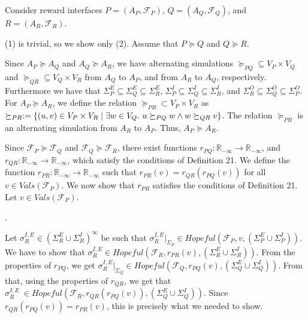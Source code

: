  
 
Consider reward interfaces $P=(A_{P},\mathcal{F}_{P})$, $Q=(A_{Q},\mathcal{F}_{Q})$, and $R=(A_{R},\mathcal{F}_{R})$.\par
 
 
 
(1) is trivial, so we show only (2). Assume that $P\succeq Q$ and $Q\succeq R$.\par
 
 
 
Since $A_{P}\succeq A_{Q}$ and $A_{Q}\succeq A_{R}$, we have alternating simulations $\succeq_{PQ}\subseteq V_{P}\times V_{Q}$ and $\succeq_{QR}\subseteq V_{Q}\times V_{R}$ from $A_{Q}$ to $A_{P}$, and from $A_{R}$ to $A_{Q}$, respectively. Furthermore we have that $\Sigma_{P}^{E}\subseteq\Sigma_{Q}^{E}\subseteq\Sigma_{R}^{E}$, $\Sigma_{P}^{I}\subseteq\Sigma_{Q}^{I}\subseteq\Sigma_{R}^{I}$, and $\Sigma_{R}^{O}\subseteq\Sigma_{Q}^{O}\subseteq\Sigma_{P}^{O}$. For $A_{P}\succeq A_{R}$, we define the relation $\succeq_{PR}\subset V_{P}\times V_{R}$ as $\succeq_{PR}:=\{(u,v)\in V_{P}\times V_{R}\mid\exists w\in V_{Q}.\nobreak\ u\succeq_{PQ}w\land w\succeq_{QR}v\}$. The relation $\succeq_{PR}$ is an alternating simulation from $A_{R}$ to $A_{P}$. Thus, $A_{P}\succeq A_{R}$.\par
 
 
 
Since $\mathcal{F}_{P}\succeq\mathcal{F}_{Q}$ and $\mathcal{F}_{Q}\succeq\mathcal{F}_{R}$, there exist functions $r_{PQ}:\mathbb{R}_{-\infty}\to\mathbb{R}_{-\infty}$, and $r_{QR}:\mathbb{R}_{-\infty}\to\mathbb{R}_{-\infty}$, which satisfy the conditions of Definition 21. We define the function $r_{PR}:\mathbb{R}_{-\infty}\to\mathbb{R}_{-\infty}$ such that $r_{PR}(v)=r_{QR}(r_{PQ}(v))$ for all $v\in\mathit{Vals}(\mathcal{F}_{P})$. We now show that $r_{PR}$ satisfies the conditions of Definition 21. Let $v\in\mathit{Vals}(\mathcal{F}_{P})$.\par
  
\par{}. 
 
Let $\sigma_{R}^{I,E}\in(\Sigma_{R}^{E}\cup\Sigma_{R}^{I})^{\infty}$ be such that $\sigma_{R}^{I,E}|_{\Sigma_{P}}\in\mathit{Hopeful}(\mathcal{F}_{P},v,(\Sigma_{P}^{E}\cup\Sigma_{P}^{I}))$. We have to show that $\sigma_{R}^{I,E}\in\mathit{Hopeful}(\mathcal{F}_{R},r_{PR}(v),(\Sigma_{R}^{E}\cup\Sigma_{R}^{I}))$. From the properties of $r_{PQ}$, we get $\sigma_{R}^{I,E}|_{\Sigma_{Q}}\in\mathit{Hopeful}(\mathcal{F}_{Q},r_{PQ}(v),(\Sigma_{Q}^{E}\cup\Sigma_{Q}^{I}))$. From that, using the properties of $r_{QR}$, we get that $\sigma_{R}^{I,E}\ \in\mathit{Hopeful}(\mathcal{F}_{R},r_{QR}(r_{PQ}(v)),(\Sigma_{Q}^{E}\cup\Sigma_{Q}^{I}))$. Since $r_{QR}(r_{PQ}(v))=r_{PR}(v)$, this is precisely what we needed to show.\par
 
